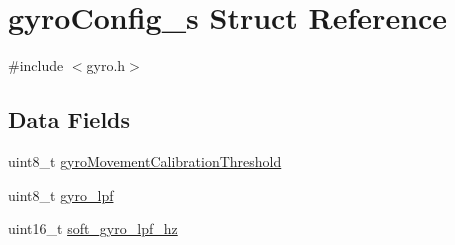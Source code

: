 \hypertarget{structgyroConfig__s}{\section{gyro\+Config\+\_\+s Struct Reference}
\label{structgyroConfig__s}
}


{\ttfamily \#include $<$gyro.\+h$>$}

\subsection*{Data Fields}
\begin{DoxyCompactItemize}
\item 
uint8\+\_\+t \hyperlink{structgyroConfig__s_ae1ba510cef0d2b28b17f457bfc8b0e70}{gyro\+Movement\+Calibration\+Threshold}
\item 
uint8\+\_\+t \hyperlink{structgyroConfig__s_a8f8ef114a23690030f125c9506ed1f84}{gyro\+\_\+lpf}
\item 
uint16\+\_\+t \hyperlink{structgyroConfig__s_a79715d5804095aa37049450ad732a7ee}{soft\+\_\+gyro\+\_\+lpf\+\_\+hz}
\end{DoxyCompactItemize}


